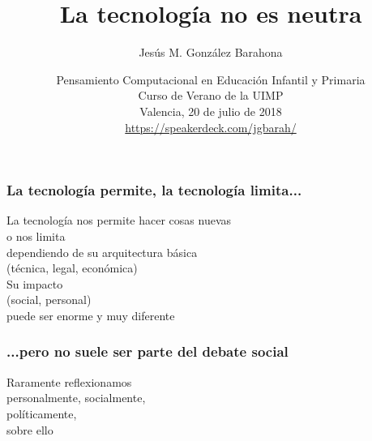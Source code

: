 \documentclass[17pt,aspectratio=169]{beamer}
\begin{document}
\title{La tecnología no es neutra}
\author{Jesús M. González Barahona}

\date{Pensamiento Computacional en Educación Infantil y Primaria \\
  Curso de Verano de la UIMP \\
  Valencia, 20 de julio de 2018\\
{\small \url{https://speakerdeck.com/jgbarah/}} \\}

\frame{
\maketitle
}





\begin{frame}
\frametitle{La tecnología permite, la tecnología limita...}

\begin{flushright}
La tecnología nos permite hacer cosas nuevas \\
o nos limita \\
dependiendo de su arquitectura básica \\
(técnica, legal, económica) \\
\vspace{.5cm}
Su impacto \\
(social, personal) \\
puede ser enorme y muy diferente \\
\end{flushright}

\end{frame}


\begin{frame}
\frametitle{...pero no suele ser parte del debate social}

\begin{center}
{\Large
Raramente reflexionamos\\
personalmente, socialmente, \\
políticamente, \\
sobre ello \\
}
\end{center}

\end{frame}
\end{document}
